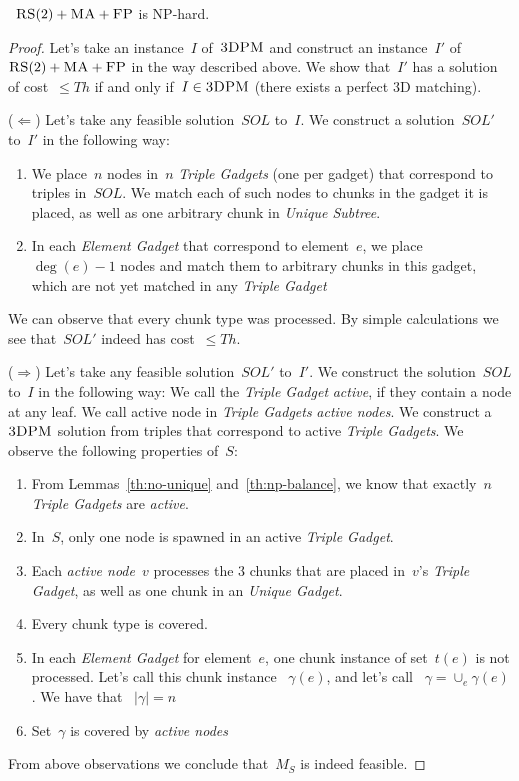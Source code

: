 \documentclass[preprint,12pt]{elsarticle}
\newcommand{\FP}{\textsc{FP}}
\newcommand{\RS}{\textsc{RS}}
\newcommand{\MA}{\textsc{MA}}
\newcommand{\TDPM}{\textsc{3DPM}}
\newcommand{\Unmatched}{\gamma}
\newcommand{\ActiveNode}{\textit{active node}}
\newcommand{\ActiveNodes}{\textit{active nodes}}
\newcommand{\Solution}{S}
\newcommand{\UnqSubtree}{{{\emph{Unique Subtree}}}}
\newcommand{\TripleGadget}{{\emph{Triple Gadget}}}
\newcommand{\TripleGadgets}{{\emph{Triple Gadgets}}}
\newcommand{\UnqGadget}{{\emph{Unique Gadget}}}
\newcommand{\ElGadget}{{\emph{Element Gadget}}}
\newcommand{\Thr}{\ensuremath{Th}}
\newcommand{\Sol}{\ensuremath{SOL}}
\begin{document}
\begin{theorem}
 ~$\RS(2)+\MA+\FP$ is NP-hard.
\end{theorem}

\begin{proof}
  
  Let's take an instance~$I$ of~$\TDPM$ and construct an instance~$I'$
  of~$\RS(2)+\MA+\FP$ in the way described above.  We show that~$I'$
  has a solution of cost~$\leq \Thr$ if and only if~$I \in \TDPM$ (there
  exists a perfect 3D matching).

  ($\Leftarrow$) Let's take any feasible solution~$\Sol$ to~$I$. We
  construct a solution~$\Sol'$ to~$I'$ in the following way:
  \begin{enumerate}
    \item We place~$n$ nodes in~$n$ {\TripleGadgets} (one per gadget)
    that correspond to triples in~$\Sol$. We match each of such nodes
    to chunks in the gadget it is placed, as well as one arbitrary
    chunk in {\UnqSubtree}.
    \item In each {\ElGadget} that correspond to element~$e$, we place
   ~$\deg(e) - 1$ nodes and match them to arbitrary chunks in this
    gadget, which are not yet matched in any {\TripleGadget}
  \end{enumerate}

  We can observe that every chunk type was processed. By simple
  calculations we see that~$\Sol'$ indeed has cost~$\leq \Thr$.

  ($\Rightarrow$) Let's take any feasible solution~$\Sol'$ to~$I'$.
  We construct the solution~$\Sol$ to~$I$ in the following way:
  We call the {\TripleGadget} \textit{active}, if they contain a node
  at any leaf. We call active node in
  {\TripleGadgets} \ActiveNodes. We construct a~$\TDPM$ solution from
  triples that correspond to active \TripleGadgets.
  We observe the following properties of~$\Solution$:
  \begin{enumerate}
    \item From Lemmas~\ref{th:no-unique} and~\ref{th:np-balance}, we
    know that exactly~$n$ {\TripleGadgets} are \emph{active}.
    \item In~$\Solution$, only one node is spawned in an active
    \TripleGadget.
    \item Each {\ActiveNode}~$v$ processes the 3 chunks that are
    placed in~$v$'s \TripleGadget, as well as one chunk in an \UnqGadget.
    \item Every chunk type is covered.
    \item In each {\ElGadget} for element~$e$, one chunk instance of
    set~$t(e)$ is not processed. Let's call this chunk instance
   ~$\Unmatched(e)$, and let's call
   ~$\Unmatched = \cup_e \Unmatched(e)$. We have that
   ~$|\Unmatched| = n$
    \item Set~$\Unmatched$ is covered by \ActiveNodes
  \end{enumerate}

  From above observations we conclude that~$M_S$ is indeed feasible.
\end{proof}
\end{document}
